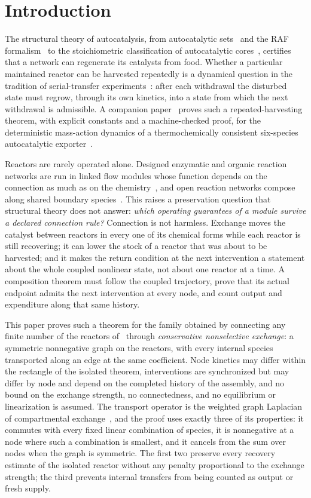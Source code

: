 \documentclass[11pt,a4paper]{article}
\theoremstyle{plain}
\theoremstyle{definition}
\theoremstyle{remark}
\begin{document}
\section{Introduction}\label{sec:intro}

The structural theory of autocatalysis, from autocatalytic sets~\citep{kauffman1986} and the RAF formalism~\citep{hordijk2004,steel2019} to the stoichiometric classification of autocatalytic cores~\citep{blokhuis2020}, certifies that a network can regenerate its catalysts from food. Whether a particular maintained reactor can be harvested repeatedly is a dynamical question in the tradition of serial-transfer experiments~\citep{mills1967,lincoln2009,vaidya2012}: after each withdrawal the disturbed state must regrow, through its own kinetics, into a state from which the next withdrawal is admissible. A companion paper~\citep{recovery2026} proves such a repeated-harvesting theorem, with explicit constants and a machine-checked proof, for the deterministic mass-action dynamics of a thermochemically consistent six-species autocatalytic exporter~\citep{thermo2026}.

Reactors are rarely operated alone. Designed enzymatic and organic reaction networks are run in linked flow modules whose function depends on the connection as much as on the chemistry~\citep{semenov2015,semenov2016}, and open reaction networks compose along shared boundary species~\citep{baez2017}. This raises a preservation question that structural theory does not answer: \emph{which operating guarantees of a module survive a declared connection rule?} Connection is not harmless. Exchange moves the catalyst between reactors in every one of its chemical forms while each reactor is still recovering; it can lower the stock of a reactor that was about to be harvested; and it makes the return condition at the next intervention a statement about the whole coupled nonlinear state, not about one reactor at a time. A composition theorem must follow the coupled trajectory, prove that its actual endpoint admits the next intervention at every node, and count output and expenditure along that same history.

This paper proves such a theorem for the family obtained by connecting any finite number of the reactors of~\citep{recovery2026} through \emph{conservative nonselective exchange}: a symmetric nonnegative graph on the reactors, with every internal species transported along an edge at the same coefficient. Node kinetics may differ within the rectangle of the isolated theorem, interventions are synchronized but may differ by node and depend on the completed history of the assembly, and no bound on the exchange strength, no connectedness, and no equilibrium or linearization is assumed. The transport operator is the weighted graph Laplacian of compartmental exchange~\citep{jacquez1993}, and the proof uses exactly three of its properties: it commutes with every fixed linear combination of species, it is nonnegative at a node where such a combination is smallest, and it cancels from the sum over nodes when the graph is symmetric. The first two preserve every recovery estimate of the isolated reactor without any penalty proportional to the exchange strength; the third prevents internal transfers from being counted as output or fresh supply.
\end{document}
